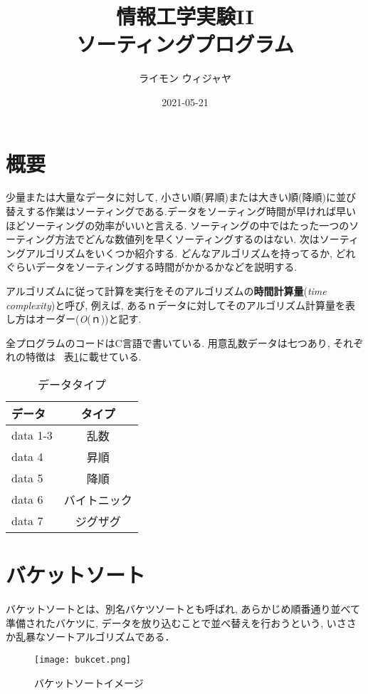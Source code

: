 \documentclass[a4j, titlepage]{jarticle}
\title{情報工学実験II\\ソーティングプログラム}
\author{ライモン ウィジャヤ}
\date{2021-05-21}
\begin{document}
\maketitle
\tableofcontents
\clearpage

\section{概要}
少量または大量なデータに対して, 小さい順(昇順)または大きい順(降順)に並び替えする作業はソーティングである.データをソーティング時間が早ければ早いほどソーティングの効率がいいと言える. ソーティングの中ではたった一つのソーティング方法でどんな数値列を早くソーティングするのはない. 次はソーティングアルゴリズムをいくつか紹介する. どんなアルゴリズムを持ってるか, どれぐらいデータをソーティングする時間がかかるかなどを説明する. 

アルゴリズムに従って計算を実行をそのアルゴリズムの\textbf{時間計算量}(\textit{time complexity})と呼び, 例えば, あるｎデータに対してそのアルゴリズム計算量を表し方はオーダー(\textit{O}(ｎ))と記す.

全プログラムのコードはC言語で書いている. 用意乱数データは七つあり, それぞれの特徴は ~表\ref{table:data-type}に載せている. 
\begin{table}[bth]
\label{table:data-type}
\caption{データタイプ}
\begin{center}
\begin{tabular}{lc}
\hline
データ & タイプ \\ \hline\hline
data 1-3 & 乱数 \\
data 4  & 昇順 \\ 
data 5 & 降順 \\
data 6 & バイトニック \\
data 7 & ジグザグ \\ \hline
\end{tabular}
\end{center}
\end{table}

\section{バケットソート}
バケットソートとは、別名バケツソートとも呼ばれ, あらかじめ順番通り並べて準備されたバケツに, データを放り込むことで並べ替えを行おうという, いささか乱暴なソートアルゴリズムである．

\begin{figure}[tbh]
\centering \texttt{[image: bukcet.png]}
\caption{バケットソートイメージ}
\label{bucket}
\end{figure}
\end{document}
